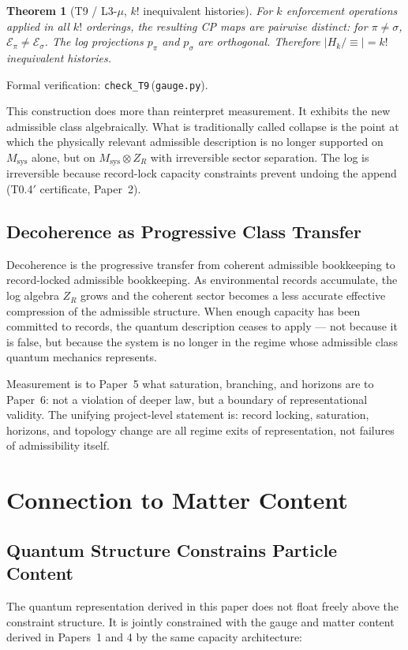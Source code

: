 \documentclass[11pt]{article}
\newtheorem{theorem}{Theorem}[section]
\newcommand{\coderef}[2]{\texttt{#1}\,(\texttt{#2})}
\begin{document}
\begin{theorem}[T9 / L3-$\mu$, $k!$ inequivalent histories]
For $k$ enforcement operations applied in all $k!$ orderings, the resulting CP
maps are pairwise distinct: for $\pi \neq \sigma$, $\mathcal{E}_{\pi} \neq
\mathcal{E}_{\sigma}$. The log projections $p_{\pi}$ and $p_{\sigma}$ are
orthogonal. Therefore $\lvert H_k / \equiv\rvert = k!$ inequivalent histories.
\end{theorem}
Formal verification: \coderef{check\_T9}{gauge.py}.

This construction does more than reinterpret measurement. It exhibits the new
admissible class algebraically. What is traditionally called collapse is the
point at which the physically relevant admissible description is no longer
supported on $M_{\mathrm{sys}}$ alone, but on $M_{\mathrm{sys}} \otimes Z_R$ with
irreversible sector separation. The log is irreversible because record-lock
capacity constraints prevent undoing the append (T0.4$'$ certificate, Paper~2).

\subsection{Decoherence as Progressive Class Transfer}
Decoherence is the progressive transfer from coherent admissible bookkeeping to
record-locked admissible bookkeeping. As environmental records accumulate, the log
algebra $Z_R$ grows and the coherent sector becomes a less accurate effective
compression of the admissible structure. When enough capacity has been committed
to records, the quantum description ceases to apply --- not because it is false,
but because the system is no longer in the regime whose admissible class quantum
mechanics represents.

\begin{bridgebox}
Measurement is to Paper~5 what saturation, branching, and horizons are to
Paper~6: not a violation of deeper law, but a boundary of representational
validity. The unifying project-level statement is: record locking, saturation,
horizons, and topology change are all regime exits of representation, not
failures of admissibility itself.
\end{bridgebox}

\section{Connection to Matter Content}\label{sec:matter}

\subsection{Quantum Structure Constrains Particle Content}
The quantum representation derived in this paper does not float freely above the
constraint structure. It is jointly constrained with the gauge and matter content
derived in Papers~1 and 4 by the same capacity architecture:
\end{document}
